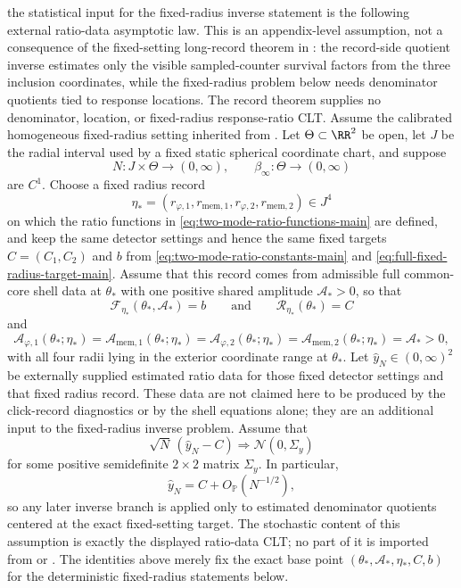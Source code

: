 \begin{assumption}\label{ass:ratio-data-clt-main}
\ResponseStandingClause the statistical input for the fixed-radius
inverse statement is the following external ratio-data asymptotic law. This is
an appendix-level assumption, not a consequence of the fixed-setting long-record theorem in
: the record-side quotient inverse estimates only the
visible sampled-counter survival factors from the three inclusion coordinates,
while the fixed-radius problem below needs denominator quotients tied to
response locations.  The record theorem supplies no denominator, location, or
fixed-radius response-ratio CLT.
Assume the calibrated homogeneous fixed-radius setting inherited from
. Let $\Theta\subset\RR^2$ be open, let $J$ be the radial
interval used by a fixed static spherical coordinate chart, and suppose
\[
N:J\times\Theta\to(0,\infty),
\qquad
\beta_\infty:\Theta\to(0,\infty)
\]
are $C^1$. Choose a fixed radius record
\[
\eta_*=(r_{\varphi,1},r_{{\mathrm{mem}},1},
        r_{\varphi,2},r_{{\mathrm{mem}},2})\in J^4
\]
on which the ratio functions in \eqref{eq:two-mode-ratio-functions-main} are
defined, and keep the same detector settings and hence the same fixed targets
$C=(C_1,C_2)$ and $b$ from
\eqref{eq:two-mode-ratio-constants-main} and
\eqref{eq:full-fixed-radius-target-main}. Assume that this record comes from
admissible full common-core shell data at $\theta_*$ with one positive shared
amplitude $\mathcal A_*>0$, so that
\[
\mathcal F_{\eta_*}(\theta_*,\mathcal A_*)=b
\qquad\text{and}\qquad
\mathcal R_{\eta_*}(\theta_*)=C
\]
and
\[
\mathcal A_{\varphi,1}(\theta_*;\eta_*)
=\mathcal A_{{\mathrm{mem}},1}(\theta_*;\eta_*)
=\mathcal A_{\varphi,2}(\theta_*;\eta_*)
=\mathcal A_{{\mathrm{mem}},2}(\theta_*;\eta_*)
=\mathcal A_*>0,
\]
with all four radii lying in the exterior coordinate range at $\theta_*$. Let
$\widehat y_N\in(0,\infty)^2$ be externally supplied estimated ratio data for
those fixed detector settings and that fixed radius record. These data are not
claimed here to be produced by the click-record diagnostics or by the shell
equations alone; they are an additional input to the fixed-radius inverse
problem. Assume that
\[
\sqrt{N}\,(\widehat y_N-C)\Longrightarrow \mathcal N(0,\Sigma_y)
\]
for some positive semidefinite $2\times2$ matrix $\Sigma_y$. In particular,
\[
\widehat y_N=C+O_{\mathbb P}(N^{-1/2}),
\]
so any later inverse branch is applied only to estimated denominator quotients
centered at the exact fixed-setting target. The stochastic content of this
assumption is exactly the displayed ratio-data CLT; no part of it is imported
from  or . The
identities above merely fix the exact base point
$(\theta_*,\mathcal A_*,\eta_*,C,b)$ for the deterministic fixed-radius
statements below.
\end{assumption}

